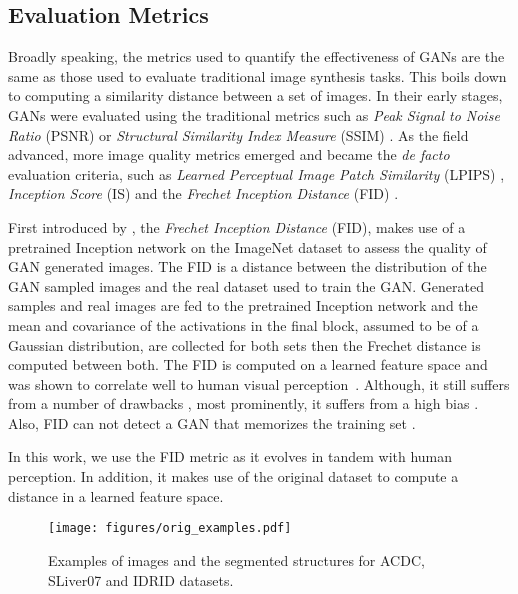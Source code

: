 \documentclass[preprint,12pt, authoryear]{elsarticle}
\begin{document}
\subsection{Evaluation Metrics}
Broadly speaking, the metrics used to quantify the effectiveness of GANs are the same as those used to evaluate traditional image synthesis tasks. This boils down to computing a similarity distance between a set of images. In their early stages, GANs were evaluated using the traditional metrics such as {\em Peak Signal to Noise Ratio} (PSNR) \citep{Regmi2018CrossViewIS} or {\em Structural Similarity Index Measure} (SSIM) \citep{Odena2017ConditionalIS}. As the field advanced, more image quality metrics emerged and became the {\em de facto} evaluation criteria, such as {\em Learned Perceptual Image Patch Similarity} (LPIPS) \citep{Zhang2018TheUE}, {\em Inception Score} (IS) \citep{Salimans2016ImprovedTF} and the {\em Frechet Inception Distance} (FID) \citep{Heusel2017GANsTB}.

First introduced by \cite{Heusel2017GANsTB}, the {\em Frechet Inception Distance} (FID), makes use of a pretrained Inception network on the ImageNet \citep{deng2009imagenet} dataset to assess the quality of GAN generated images. The FID is a distance between the distribution of the GAN sampled images and the real dataset used to train the GAN. Generated samples and real images are fed to the pretrained Inception network and the mean and covariance of the activations in the final block, assumed to be of a Gaussian distribution,  are collected for both sets then the Frechet distance is computed between both. The FID is computed on a learned feature space and was shown to correlate well to human visual perception~\citep{Zhang2018TheUE}. Although, it still suffers from a number of drawbacks \citep{Borji2019ProsAC}, most prominently, it suffers from a high bias \citep{Binkowski2018DemystifyingMG}. Also, FID can not detect a GAN that memorizes the training set \citep{Lucic2018AreGC}.

In this work, we use the FID metric as it evolves in tandem with human perception. In addition, it makes use of the original dataset to compute a distance in a learned feature space.

\begin{figure}[tp]
\centering
\texttt{[image: figures/orig\_examples.pdf]}
\caption{\small Examples of images and the segmented structures for ACDC, SLiver07 and IDRID datasets.}
\label{fig_orig_images_ex}
\end{figure}
\end{document}
